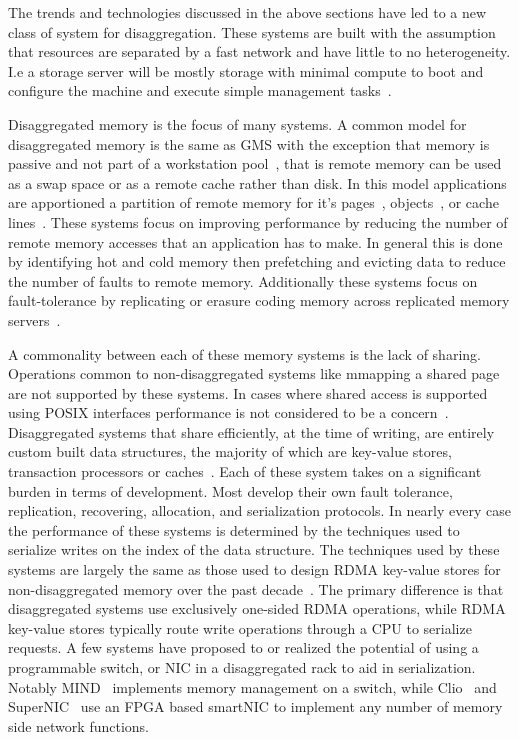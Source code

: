 \documentclass[12pt]{ucsddissertation}
\begin{document}

The trends and technologies discussed in the above sections have led to a new class of system for
disaggregation. These systems are built with the assumption that resources are separated by a fast
network and have little to no heterogeneity. I.e a storage server will be mostly storage with
minimal compute to boot and configure the machine and execute simple management
tasks~\cite{aguilera2019designing,fast-networks,dis-and-app,legoos}.

Disaggregated memory is the focus of many systems. A common model for disaggregated memory is the
same as GMS with the exception that memory is passive and not part of a workstation pool~\cite{gms},
that is remote memory can be used as a swap space or as a remote cache rather than disk. In this
model applications are apportioned a partition of remote memory for it's
pages~\cite{infiniswap,fastswap,leap,blade-server,legoos,hydra}, objects~\cite{aifm,carbink}, or
cache lines~\cite{kona}. These systems focus on improving performance by reducing the number of
remote memory accesses that an application has to make. In general this is done by identifying hot
and cold memory then prefetching and evicting data to reduce the number of faults to remote memory.
Additionally these systems focus on fault-tolerance by replicating or erasure coding memory across
replicated memory servers~\cite{hydra}.

A commonality between each of these memory systems is the lack of sharing. Operations common to
non-disaggregated systems like mmapping a shared page are not supported by these systems. In cases
where shared access is supported using POSIX interfaces performance is not considered to be a
concern~\cite{Regions}. Disaggregated systems that share efficiently, at the time of writing, are
entirely custom built data structures, the majority of which are key-value stores, transaction
processors or caches~\cite{clover, sherman, race, fusee, rolex, ford, ditto}. Each of these system
takes on a significant burden in terms of development. Most develop their own fault tolerance,
replication, recovering, allocation, and serialization protocols. In nearly every case the
performance of these systems is determined by the techniques used to serialize writes on the index
of the data structure.
The techniques used by these systems are largely the same as those used to design RDMA key-value
stores for non-disaggregated memory over the past decade~\cite{pilaf,cell,herd,farm}. The primary
difference is that disaggregated systems use exclusively one-sided RDMA operations, while RDMA
key-value stores typically route write operations through a CPU to serialize requests.
A few systems have proposed to or realized the potential of using a programmable switch, or NIC in a
disaggregated rack to aid in serialization. Notably MIND~\cite{mind} implements memory management on
a switch, while Clio~\cite{clio} and SuperNIC~\cite{supernic} use an FPGA based smartNIC to
implement any number of memory side network functions.
\end{document}
